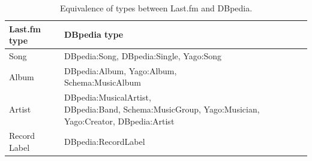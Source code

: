 


\begin{table}
\small
\centering
\def\arraystretch{1.2}
	\begin{tabular}{ l l }
\hline
\textbf{Last.fm type} & \textbf{DBpedia type} \\
\hline
Song & DBpedia:Song, DBpedia:Single, Yago:Song \\
Album & \parbox[t]{5cm}{DBpedia:Album, Yago:Album,\\ Schema:MusicAlbum} \\
Artist & \parbox[t]{5cm}{DBpedia:MusicalArtist, \\DBpedia:Band, Schema:MusicGroup, Yago:Musician, Yago:Creator, DBpedia:Artist} \\
Record Label & DBpedia:RecordLabel \\
\hline
	\end{tabular}
	\caption{Equivalence of types between Last.fm and DBpedia.}
	\label{tbl:linking:equivalence}
\end{table}

